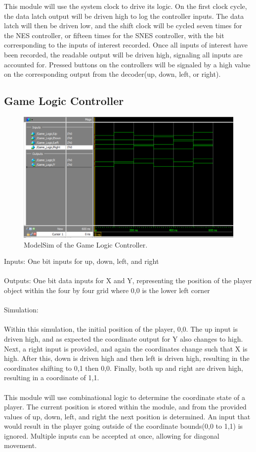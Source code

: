\documentclass[]{article}
\begin{document}
This module will use the system clock to drive its logic. On the first clock cycle, the data latch output will be driven high to log the controller inputs. The data latch will then be driven low, and the shift clock will be cycled seven times for the NES controller, or fifteen times for the SNES controller, with the bit corresponding to the inputs of interest recorded. Once all inputs of interest have been recorded, the readable output will be driven high, signaling all inputs are accounted for. Pressed buttons on the controllers will be signaled by a high value on the corresponding output from the decoder(up, down, left, or right). 
\subsection{Game Logic Controller}
\begin{figure}[H]
	\includegraphics[width=\linewidth]{Game_Logic_ModelSim.png}
	\caption{ModelSim of the Game Logic Controller.}
\end{figure}
Inputs: One bit inputs for up, down, left, and right\\~\\
Outputs: One bit data inputs for X and Y, representing the position of the player object within the four by four grid where 0,0 is the lower left corner \\~\\
Simulation: \\~\\
Within this simulation, the initial position of the player, 0,0. The up input is driven high, and as expected the coordinate output for Y also changes to high. Next, a right input is provided, and again the coordinates change such that X is high. After this, down is driven high and then left is driven high, resulting in the coordinates shifting to 0,1 then 0,0. Finally, both up and right are driven high, resulting in a coordinate of 1,1.\\~\\
This module will use combinational logic to determine the coordinate state of a player. The current position is stored within the module, and from the provided values of up, down, left, and right the next position is determined. An input that would result in the player going outside of the coordinate bounds(0,0 to 1,1) is ignored. Multiple inputs can be accepted at once, allowing for diagonal movement.  
\end{document}
